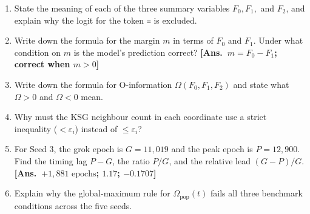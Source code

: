 \documentclass[11pt,a4paper,oneside]{report}
\newcommand{\Fzero}{F_{0}}
\newcommand{\Fone}{F_{1}}
\newcommand{\Ftwo}{F_{2}}
\newcommand{\Omegapop}{\Omega_{\mathrm{pop}}}
\begin{document}
\begin{enumerate}[label=\textbf{\arabic*.}]
\item State the meaning of each of the three summary variables $\Fzero, \Fone,$ and $\Ftwo$, and explain why the logit for the token \texttt{=} is excluded.
\item Write down the formula for the margin $m$ in terms of $\Fzero$ and $\Fone$. Under what condition on $m$ is the model's prediction correct? \hfill\textbf{[Ans.\ $m = \Fzero - \Fone$; correct when $m > 0$]}
\item Write down the formula for O-information $\Omega(\Fzero, \Fone, \Ftwo)$ and state what $\Omega > 0$ and $\Omega < 0$ mean.
\item Why must the KSG neighbour count in each coordinate use a strict inequality ($< \varepsilon_i$) instead of $\le \varepsilon_i$?
\item For Seed 3, the grok epoch is $G = 11{,}019$ and the peak epoch is $P = 12{,}900$. Find the timing lag $P - G$, the ratio $P/G$, and the relative lead $(G - P)/G$. \hfill\textbf{[Ans.\ $+1{,}881\text{ epochs}$; $1.17$; $-0.1707$]}
\item Explain why the global-maximum rule for $\Omegapop(t)$ fails all three benchmark conditions across the five seeds.
\end{enumerate}
\end{document}
